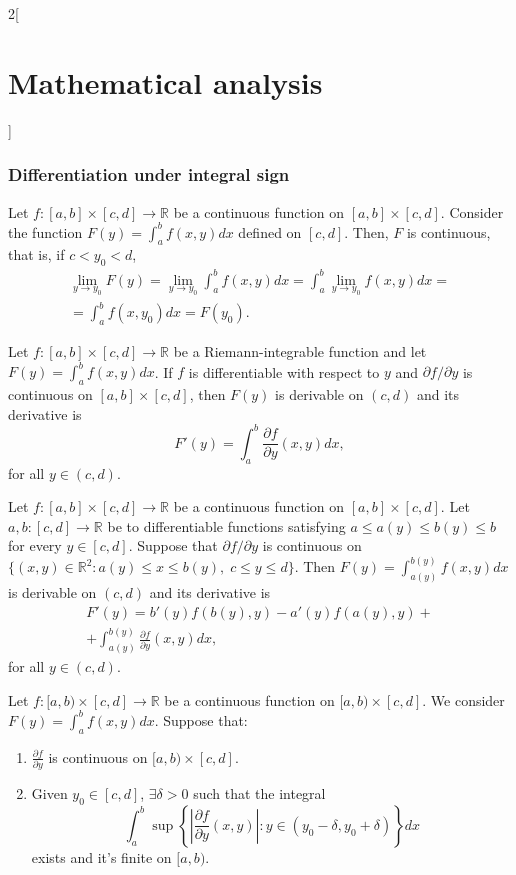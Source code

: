 \documentclass[../../../main.tex]{subfiles}
\begin{document}
\begin{multicols}{2}[\section{Mathematical analysis}]
\subsubsection*{Differentiation under integral sign}
\begin{theorem}
Let $f:[a,b]\times[c,d]\rightarrow\mathbb{R}$ be a continuous function on $[a,b]\times[c,d]$. Consider the function $\displaystyle F(y)=\int_a^bf(x,y)dx$ defined on $[c,d]$. Then, $F$ is continuous, that is, if $c<y_0<d$, \begin{multline*}
    \lim_{y\to y_0}F(y)=\lim_{y\to y_0}\int_a^bf(x,y)dx=\int_a^b\lim_{y\to y_0}f(x,y)dx=\\=\int_a^bf(x,y_0)dx=F(y_0).
\end{multline*}
\end{theorem}
\begin{theorem}
Let $f:[a,b]\times[c,d]\rightarrow\mathbb{R}$ be a Riemann-integrable function and let $\displaystyle F(y)=\int_a^bf(x,y)dx$. If $f$ is differentiable with respect to $y$ and $\partial f/\partial y$ is continuous on $[a,b]\times[c,d]$, then $F(y)$ is derivable on $(c,d)$ and its derivative is $$F'(y)=\int_a^b\frac{\partial f}{\partial y}(x,y)dx,$$ for all $y\in(c,d)$.
\end{theorem}
\begin{theorem}
Let $f:[a,b]\times[c,d]\rightarrow\mathbb{R}$ be a continuous function on $[a,b]\times[c,d]$. Let $a,b:[c,d]\rightarrow\mathbb{R}$ be to differentiable functions satisfying $a\leq a(y)\leq b(y)\leq b$ for every $y\in[c,d]$. Suppose that $\partial f/\partial y$ is continuous on $\{(x,y)\in\mathbb{R}^2:a(y)\leq x\leq b(y),\; c\leq y\leq d\}$. Then $\displaystyle F(y)=\int_{a(y)}^{b(y)}f(x,y)dx$ is derivable on $(c,d)$ and its derivative is \begin{multline*}
    F'(y)=b'(y)f(b(y),y)-a'(y)f(a(y),y)+\\+\int_{a(y)}^{b(y)}\frac{\partial f}{\partial y}(x,y)dx,
\end{multline*} for all $y\in(c,d)$.
\end{theorem}
\begin{theorem}
Let $f:[a,b)\times[c,d]\rightarrow\mathbb{R}$ be a continuous function on $[a,b)\times[c,d]$. We consider $\displaystyle F(y)=\int_a^bf(x,y)dx$. Suppose that: 
\begin{enumerate}
    \item $\displaystyle\frac{\partial f}{\partial y}$ is continuous on $[a,b)\times[c,d]$.
    \item Given $y_0\in[c,d]$, $\exists\delta>0$ such that the integral $$\int_a^b\sup\left\{\left|\frac{\partial f}{\partial y}(x,y)\right|:y\in(y_0-\delta,y_0+\delta)\right\}dx$$ exists and it's finite on $[a,b)$.

\end{enumerate}
\end{theorem}
\end{multicols}
\end{document}
